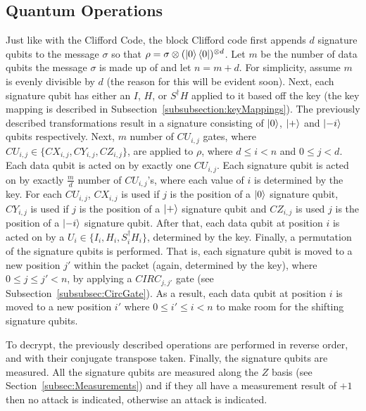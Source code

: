 \subsection{Quantum Operations}
Just like with the Clifford Code, the block Clifford code first appends $d$ signature qubits to the message $\sigma$ so that $\rho = \sigma \otimes (\ket{0}\bra{0})^{\otimes d}$. Let $m$ be the number of data qubits the message $\sigma$ is made up of and let $n = m + d$. For simplicity, assume $m$ is evenly divisible by $d$ (the reason for this will be evident soon). Next, each signature qubit has either an $I$, $H$, or $S^{\dagger}H$ applied to it based off the key (the key mapping is described in Subsection~\ref{subsubsection:keyMappings}). The previously described transformations result in a signature consisting of $\ket{0}$, $\ket{+}$ and $\ket{-i}$ qubits respectively. Next, $m$ number of $\mathit{CU}_{i,j}$ gates, where $\mathit{CU}_{i,j} \in \{\mathit{CX}_{i,j}, \mathit{CY}_{i,j}, \mathit{CZ}_{i,j}\}$, are applied to $\rho$, where $d \leq i < n$ and $0 \leq j < d$. Each data qubit is acted on by exactly one $\mathit{CU}_{i,j}$. Each signature qubit is acted on by exactly $\frac{m}{d}$ number of $\mathit{CU}_{i,j}$'s, where each value of $i$ is determined by the key. For each $\mathit{CU}_{i,j}$, $\mathit{CX}_{i,j}$ is used if $j$ is the position of a $\ket{0}$ signature qubit, $\mathit{CY}_{i,j}$ is used if $j$ is the position of a $\ket{+}$ signature qubit and $\mathit{CZ}_{i,j}$ is used $j$ is the position of a $\ket{-i}$ signature qubit. After that, each data qubit at position $i$ is acted on by a $U_i \in \{I_i,H_i,S_i^{\dagger}H_i\}$, determined by the key. Finally, a permutation of the signature qubits is performed. That is, each signature qubit is moved to a new position $j'$ within the packet (again, determined by the key), where $0 \leq j \leq j' < n$,  by applying a $\mathit{CIRC}_{j,j'}$ gate (see Subsection~\ref{subsubsec:CircGate}). As a result, each data qubit at position $i$ is moved to a new position $i'$ where $0 \leq i' \leq i < n$ to make room for the shifting signature qubits.
 
To decrypt, the previously described operations are performed in reverse order, and with their conjugate transpose taken. Finally, the signature qubits are measured. All the signature qubits are measured along the $Z$ basis (see Section~\ref{subsec:Measurements}) and if they all have a measurement result of $+1$ then no attack is indicated, otherwise an attack is indicated.

